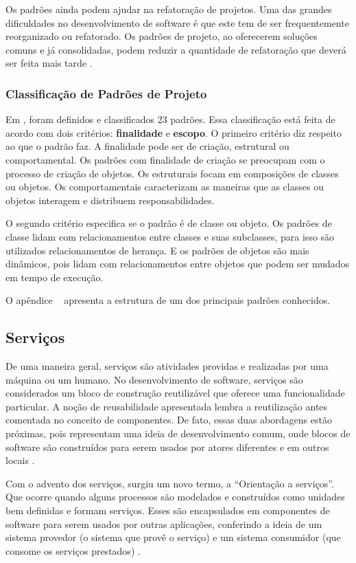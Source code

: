 Os padrões ainda podem ajudar na refatoração de projetos. Uma das grandes dificuldades no desenvolvimento de software é que este tem de ser frequentemente reorganizado ou refatorado. Os padrões de projeto, ao oferecerem soluções comuns e já consolidadas, podem reduzir a quantidade de refatoração que deverá ser feita mais tarde \cite{Gamma:1995}.

\subsubsection{Classificação de Padrões de Projeto}

Em \cite{Gamma:1995}, foram definidos e classificados 23 padrões. Essa classificação está feita de acordo com dois critérios: \textbf{finalidade} e \textbf{escopo}. O primeiro critério diz respeito ao que o padrão faz. A finalidade pode ser de criação, estrutural ou comportamental. Os padrões com finalidade de criação se preocupam com o processo de criação de objetos. Os estruturais focam em composições de classes ou objetos. Os comportamentais caracterizam as maneiras que as classes ou objetos interagem e distribuem responsabilidades.

O segundo critério especifica se o padrão é de classe ou objeto. Os padrões de classe lidam com relacionamentos entre classes e suas subclasses, para isso são utilizados relacionamentos de herança. E os padrões de objetos são mais dinâmicos, pois lidam com relacionamentos entre objetos que podem ser mudados em tempo de execução.

O apêndice ~ apresenta a estrutura de um dos principais padrões conhecidos.

\subsection{Serviços}

De uma maneira geral, serviços são atividades providas e realizadas por uma máquina ou um humano. No desenvolvimento de software, serviços são considerados um bloco de construção reutilizável que oferece uma funcionalidade particular. A noção de reusabilidade apresentada lembra a reutilização antes comentada no conceito de componentes. De fato, essas duas abordagens estão próximas, pois representam uma ideia de desenvolvimento comum, onde blocos de software são construídos para serem usados por atores diferentes e em outros locais \cite{Stojanovic:Dahanayake:2005}.

Com o advento dos serviços, surgiu um novo termo, a ``Orientação a serviços''. Que ocorre quando alguns processos são modelados e construídos como unidades bem definidas e formam serviços. Esses são encapsulados em componentes de software para serem usados por outras aplicações, conferindo a ideia de um sistema provedor (o sistema que provê o serviço) e um sistema consumidor (que consome os serviços prestados) \cite{Victorino:Brascher:2009}.

